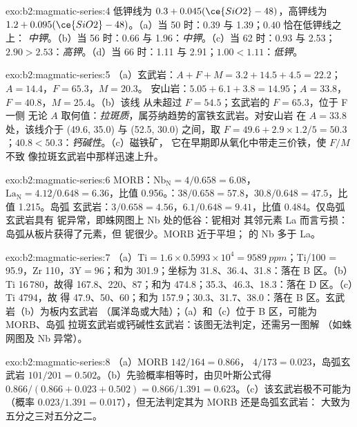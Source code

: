 \begin{solution}{exo:b2:magmatic-series:4}
低钾线为 $0.3 + 0.045(\ce{SiO2} - 48)$，高钾线为 $1.2 +
0.095(\ce{SiO2} - 48)$。（a）当 50 时：0.39 与 1.39；$0.40$ 恰在低钾线之上：
\emph{中钾}。（b）当 56 时：0.66 与 1.96：\emph{中钾}。（c）当 62 时：0.93 与 2.53；
$2.90 > 2.53$：\emph{高钾}。（d）当 66 时：1.11 与 2.91；$1.00 < 1.11$：\emph{低钾}。
\end{solution}

\begin{solution}{exo:b2:magmatic-series:5}
（a）玄武岩：$A + F + M = 3.2 + 14.5 + 4.5 = 22.2$；$A = 14.4$，$F = 65.3$，$M = 20.3$。
安山岩：$5.05 + 6.1 + 3.8 = 14.95$；$A = 33.8$，$F = 40.8$，$M = 25.4$。（b）该线
从未超过 $F = 54.5$；玄武岩的 $F = 65.3$，位于 F 一侧
无论 $A$ 取何值：\emph{拉斑质}，属芬纳趋势的富铁玄武岩。对安山岩
在 $A = 33.8$ 处，该线介于 (49.6, 35.0) 与 (52.5, 30.0) 之间，取 $F =
49.6 + 2.9\times1.2/5 = 50.3$；$40.8 < 50.3$：\emph{钙碱性}。（c）磁铁矿，
它在早期即从氧化中带走三价铁，使 $F/M$ 不致
像拉斑玄武岩中那样迅速上升。
\end{solution}

\begin{solution}{exo:b2:magmatic-series:6}
MORB：$\mathrm{Nb_N} = 4/0.658 = 6.08$，$\mathrm{La_N} = 4.12/0.648 = 6.36$，比值
0.956。：$38/0.658 = 57.8$，$30.8/0.648 = 47.5$，比值 1.215。岛弧
玄武岩：$3/0.658 = 4.56$，$6.1/0.648 = 9.41$，比值 0.484。仅岛弧玄武岩具有
铌异常，即蛛网图上 Nb 处的低谷：铌相对
其邻元素 La 而言亏损：岛弧从板片获得了元素，但
铌很少。MORB 近于平坦；
的 Nb 多于 La。
\end{solution}

\begin{solution}{exo:b2:magmatic-series:7}
（a）$\mathrm{Ti} = 1.6\times0.5993\times10^4 = \qty{9589}{ppm}$；Ti/100 = 95.9，Zr
110，$3\mathrm Y = 96$；和为 301.9；坐标为 31.8、36.4、31.8：落在 B 区。（b）Ti
16\,780，故得 167.8、220、87；和为 474.8；35.3、46.3、18.3：落在 D 区。（c）Ti 4794，故
得 47.9、50、60；和为 157.9；30.3、31.7、38.0：落在 B 区。玄武岩（b）为板内玄武岩
（属洋岛或大陆）；（a）和（c）位于 B 区，可能为 MORB、岛弧
拉斑玄武岩或钙碱性玄武岩：该图无法判定，还需另一图解
（如蛛网图及 Nb 异常）。
\end{solution}

\begin{solution}{exo:b2:magmatic-series:8}
（a）MORB $142/164 = 0.866$， $4/173 = 0.023$，岛弧玄武岩 $101/201 =
0.502$。（b）先验概率相等时，由贝叶斯公式得 $0.866/(0.866 + 0.023 + 0.502) =
0.866/1.391 = 0.623$。（c）该玄武岩极不可能为
（概率 $0.023/1.391 = 0.017$），但无法判定其为 MORB 还是岛弧玄武岩：
大致为五分之三对五分之二。
\end{solution}


